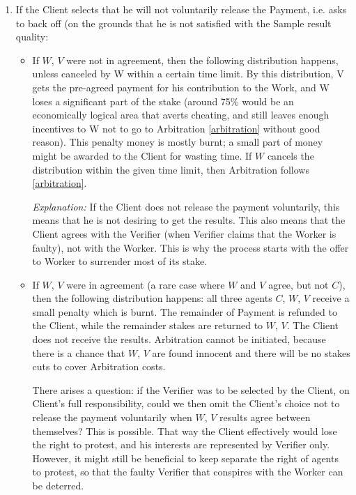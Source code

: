 \documentclass{article}
\begin{document}
\begin{enumerate}
    \item If the Client selects that he will not voluntarily release the Payment, i.e. asks to back off (on the grounds that he is not satisfied with the Sample result quality:
        \begin{itemize}
            \item If $W$, $V$ were not in agreement, then the following distribution happens, unless canceled by W within a certain time limit. By this distribution, V gets the pre-agreed payment for his contribution to the Work, and W loses a significant part of the stake (around 75\% would be an economically logical area that averts cheating, and still leaves enough incentives to W not to go to Arbitration \ref{arbitration} without good reason). This penalty money is mostly burnt; a small part of money might be awarded to the Client for wasting time. If $W$ cancels the distribution within the given time limit, then Arbitration follows \ref{arbitration}.
            
            \textit{Explanation:} If the Client does not release the payment voluntarily, this means that he is not desiring to get the results. This also means that the Client agrees with the Verifier (when Verifier claims that the Worker is faulty), not with the Worker. This is why the process starts with the offer to Worker to surrender most of its stake.
            
            \item If $W$, $V$ were in agreement (a rare case where $W$ and $V$ agree, but not $C$), then the following distribution happens: all three agents $C$, $W$, $V$ receive a small penalty which is burnt. The remainder of Payment is refunded to the Client, while the remainder stakes are returned to $W$, $V$. The Client does not receive the results. Arbitration cannot be initiated, because there is a chance that $W$, $V$ are found innocent and there will be no stakes cuts to cover Arbitration costs. 
            
            There arises a question: if the Verifier was to be selected by the Client, on Client's full responsibility, could we then omit the Client's choice not to release the payment voluntarily when $W$, $V$ results agree between themselves? This is possible. That way the Client effectively would lose the right to protest, and his interests are represented by Verifier only. However, it might still be beneficial to keep separate the right of agents to protest, so that the faulty Verifier that conspires with the Worker can be deterred.
        \end{itemize}


\end{enumerate}
\end{document}
